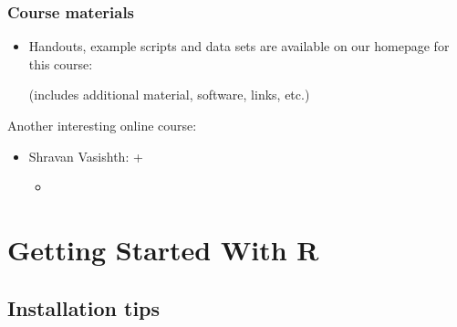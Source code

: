 \documentclass[t]{beamer} %
\begin{document}
\begin{frame}
  \frametitle{Course materials}

  \begin{itemize}
  \item Handouts, example scripts and data sets are available on our homepage
    for this course:\\[4mm]
    \begin{center}
    \end{center}
    \gap[.5]
    (includes additional material, software, links, etc.)
  \end{itemize}

  \gap[3]
  Another interesting online course:
  \begin{itemize}
  \item Shravan Vasishth:  + 
    \begin{itemize}
    \item {}
    \end{itemize}
  \end{itemize}
\end{frame}

\section{Getting Started With R}

\subsection{Installation tips}
\end{document}
